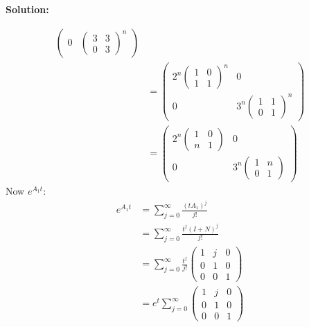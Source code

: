 \documentclass[12pt]{article}
\newenvironment{solution}{
    \textbf{Solution:}
    
}{
    
    \vspace{2em}
}
\begin{document}
\begin{solution}
\[\begin{aligned}
\begin{pmatrix}
                0 & \begin{pmatrix}
                    3 & 3 \\
                    0 & 3
                \end{pmatrix}^n
            \end{pmatrix}\\
            &= \begin{pmatrix}
                2^n \begin{pmatrix}
                    1 & 0 \\
                    1 & 1
                \end{pmatrix}^n & 0 \\
                0 & 3^n \begin{pmatrix}
                    1 & 1 \\
                    0 & 1
                \end{pmatrix}^n
            \end{pmatrix}\\
            &= \begin{pmatrix}
                2^n \begin{pmatrix}
                    1 & 0 \\
                    n & 1
                \end{pmatrix} & 0 \\
                0 & 3^n \begin{pmatrix}
                    1 & n \\
                    0 & 1
                \end{pmatrix}
            \end{pmatrix}
        \end{aligned}
    \]
    Now \(e^{A_1 t}\):
    \[
        \begin{aligned}
            e^{A_1 t} &= \sum_{j=0}^\infty \frac{(tA_1)^j}{j!}\\
            &= \sum_{j=0}^\infty \frac{t^j(I + N)^j}{j!}\\
            &= \sum_{j=0}^\infty \frac{t^j}{j!} \begin{pmatrix}
                1 & j & 0 \\
                0 & 1 & 0 \\
                0 & 0 & 1
            \end{pmatrix}\\
            &= e^t \sum_{j=0}^\infty \begin{pmatrix}
                1 & j & 0 \\
                0 & 1 & 0 \\
                0 & 0 & 1
            \end{pmatrix}\\
        \end{aligned}
    \]
    

\end{solution}
\end{document}
